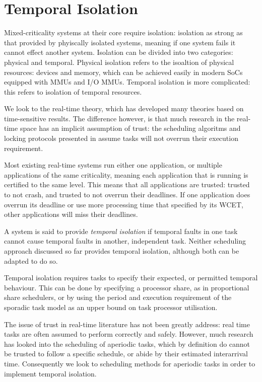 \chapter{Temporal Isolation}
\label{chap:scheduling}

Mixed-criticality systems at their core require isolation: isolation as strong as that provided by phyiscally isolated systems, meaning if one system fails it cannot effect another system.
Isolation can be divided into two categories: physical and temporal.
Physical isolation refers to the isoaltion of physical resources: devices and memory, which can be achieved easily in modern \glspl{SoC} equipped with \glspl{MMU} and I/O \glspl{MMU}.
Temporal isolation is more complicated: this refers to isolation of temporal resources.

We look to the real-time theory, which has developed many theories based on time-sensitive results.
The difference however, is that much research in the real-time space has an implicit assumption of trust: the scheduling algoritms and locking protocols presented in  assume tasks will not overrun their execution requirement. 

Most existing real-time systems run either one application, or multiple applications of the same criticality, meaning each application that is running is certified to the same level.
This means that all applications are trusted: trusted to not crash, and trusted to not overrun their deadlines.
If one application does overrun its deadline or use more processing time that specified by its \gls{WCET}, other applications will miss their deadlines.

A system is said to provide \emph{temporal isolation} if temporal faults in one task cannot cause temporal faults in another, independent task.
Neither scheduling approach discussed so far provides temporal isolation, although both can be adapted to do so.

Temporal isolation requires tasks to specify their expected, or permitted temporal behaviour.
This can be done by specifying a processor share, as in proportional share schedulers, or by using the period and execution requirement of the sporadic task model as an upper bound on task processor utilisation.

The issue of trust in real-time literature has not been greatly address: real time tasks are often assumed to perform correctly and safely.
However, much research has looked into the scheduling of aperiodic tasks, which by definition do cannot be trusted to follow a specific schedule, or abide by their estimated interarrival time.
Consequently we look to scheduling methods for aperiodic tasks in order to implement temporal isolation.

